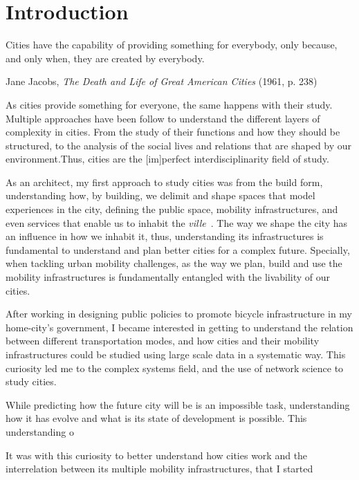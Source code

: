 \chapter{Introduction}

\epigraph{Cities have the capability of providing something for everybody, only because, and only when, they are created by everybody.}{Jane Jacobs, \textit{The Death and Life of Great American Cities} (1961, p. 238)}

As cities provide something for everyone, the same happens with their study. Multiple approaches have been follow to understand the different layers of complexity in cities. From the study of their functions and how they should be structured, to the analysis of the social lives and relations that are shaped by our environment.Thus, cities are the [im]perfect interdisciplinarity field of study.

As an architect, my first approach to study cities was from the build form, understanding how, by building, we delimit and shape spaces that model experiences in the city, defining the public space, mobility infrastructures, and even services that enable us to inhabit the \textit{ville}~\cite{sennett2018building}. The way we shape the city has an influence in how we inhabit it, thus, understanding its infrastructures is fundamental to understand and plan better cities for a complex future. Specially, when tackling urban mobility challenges, as the way we plan, build and use the mobility infrastructures is fundamentally entangled with the livability of our cities.

After working in designing public policies to promote bicycle infrastructure in my home-city's government, I became interested in getting to understand the relation between different transportation modes, and how cities and their mobility infrastructures could be studied using large scale data in a systematic way. This curiosity led me to the complex systems field, and the use of network science to study cities.

While predicting how the future city will be is an impossible task, understanding how it has evolve and what is its state of development is possible. This understanding o

It was with this curiosity to better understand how cities work and the interrelation between its multiple mobility infrastructures, that I started 

